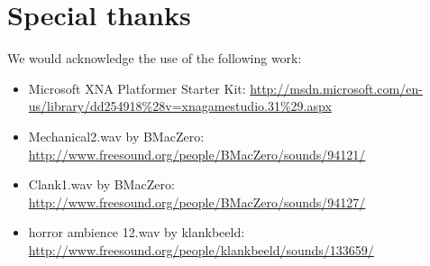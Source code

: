 \documentclass{article}
\begin{document}
 \section{Special thanks}
 We would acknowledge the use of the following work:
 
\begin{itemize}
	\item Microsoft XNA Platformer Starter Kit: \url{http://msdn.microsoft.com/en-us/library/dd254918\%28v=xnagamestudio.31\%29.aspx}
	\item Mechanical2.wav by BMacZero: \url{http://www.freesound.org/people/BMacZero/sounds/94121/}
	\item Clank1.wav by BMacZero: \url{http://www.freesound.org/people/BMacZero/sounds/94127/}
	\item horror ambience 12.wav by klankbeeld: \url{http://www.freesound.org/people/klankbeeld/sounds/133659/}
\end{itemize}
 
\end{document}
